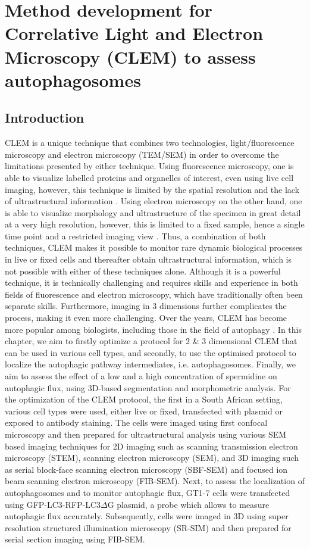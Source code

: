 \chapter{Method development for Correlative Light and Electron Microscopy (CLEM) to assess autophagosomes}
\label{sec:chapter6}
\section{Introduction}
CLEM is a unique technique that combines two technologies, light/fluorescence microscopy and electron microscopy (TEM/SEM) in order to overcome the limitations presented by either technique. Using fluorescence microscopy, one is able to visualize labelled proteins and organelles of interest, even using live cell imaging, however, this technique is limited by the spatial resolution and the lack of ultrastructural information \citep{Russell2017}. Using electron microscopy on the other hand, one is able to visualize morphology and ultrastructure of the specimen in great detail at a very high resolution, however, this is limited to a fixed sample, hence a single time point and a restricted imaging view \citep{Liss2016,Russell2017}. Thus, a combination of both techniques, CLEM makes it possible to monitor rare dynamic biological processes in live or fixed cells and thereafter obtain ultrastructural information, which is not possible with either of these techniques alone. Although it is a powerful technique, it is technically challenging and requires skills and experience in both fields of fluorescence and electron microscopy, which have traditionally often been separate skills. Furthermore, imaging in 3 dimensions further complicates the process, making it even more challenging. Over the years, CLEM has become more popular among biologists, including those in the field of autophagy \citep{Duke2014,Hosseini2014, Russell2017,Gudmundsson2019}. In this chapter, we aim to firstly optimize a protocol for 2 \& 3 dimensional CLEM that can be used in various cell types, and secondly, to use the optimised protocol to localize the autophagic pathway intermediates, i.e. autophagosomes. Finally, we aim to assess the effect of a low and a high concentration of spermidine on autophagic flux, using 3D-based segmentation and morphometric analysis. For the optimization of the CLEM protocol, the first in a South African setting, various cell types were used, either live or fixed, transfected with plasmid or exposed to antibody staining. The cells were imaged using first confocal microscopy and then prepared for ultrastructural analysis using various SEM based imaging techniques for 2D imaging such as scanning transmission electron microscopy (STEM), scanning electron microscopy (SEM), and 3D imaging such as serial block-face scanning electron microscopy (SBF-SEM) and focused ion beam scanning electron microscopy (FIB-SEM). Next, to assess the localization of autophagosomes and to monitor autophagic flux, GT1-7 cells were transfected using GFP-LC3-RFP-LC3$\Delta$G plasmid, a probe which allows to measure autophagic flux accurately. Subsequently, cells were imaged in 3D using super resolution structured illumination microscopy (SR-SIM) and then prepared for serial section imaging using FIB-SEM. 

